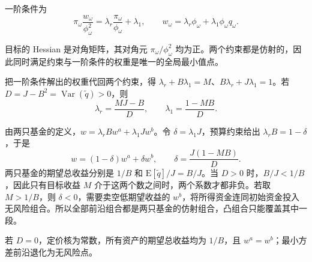 \begin{solution}[blank-type=manual,blank-vsep=9\baselineskip]
\begin{enumerate}[label=(\alph*)]
一阶条件为
\[
 \pi_\omega\frac{w_\omega}{\phi_\omega^2}
 =\lambda_r\frac{\pi_\omega}{\phi_\omega}+\lambda_1,
 \qquad w_\omega=\lambda_r\phi_\omega+\lambda_1\phi_\omega q_\omega.
\]

目标的 Hessian 是对角矩阵，其对角元 $\pi_\omega/\phi_\omega^2$ 均为正。两个约束都是仿射的，因此同时满足约束与一阶条件的权重是唯一的全局最小值点。

把一阶条件解出的权重代回两个约束，得 $\lambda_r+B\lambda_1=M$、$B\lambda_r+J\lambda_1=1$。若 $D=J-B^2=\operatorname{Var}(\widetilde q)>0$，则
\[
 \lambda_r=\frac{MJ-B}{D},\qquad\lambda_1=\frac{1-MB}{D}.
\]

由两只基金的定义，$w=\lambda_r B w^a+\lambda_1J w^b$。令 $\delta=\lambda_1J$，预算约束给出 $\lambda_r B=1-\delta$，于是
\[
 \boxed{w=(1-\delta)w^a+\delta w^b,\qquad
 \delta=\frac{J(1-MB)}{D}}.
\]
两只基金的期望总收益分别是 $1/B$ 和 $\mathrm E[\widetilde q]/J=B/J$。当 $D>0$ 时，$B/J<1/B$，因此只有目标收益 $M$ 介于这两个数之间时，两个系数才都非负。若取 $M>1/B$，则 $\delta<0$，需要卖空低期望收益的 $w^b$，将所得资金连同初始资金投入无风险组合。所以全部前沿组合都是两只基金的仿射组合，凸组合只能覆盖其中一段。

若 $D=0$，定价核为常数，所有资产的期望总收益均为 $1/B$，且 $w^a=w^b$；最小方差前沿退化为无风险点。\qedhere
\end{enumerate}
\end{solution}


